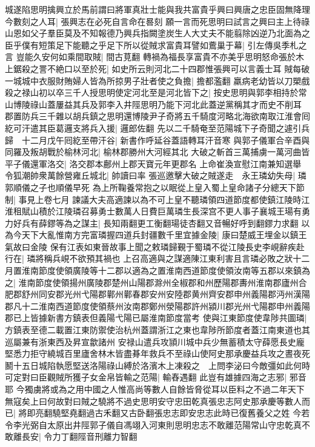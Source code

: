 城遂陷思明擒興立於馬前謂曰將軍真壯士能與我共富貴乎興曰興唐之忠臣固無降理今數刻之人耳|{
	張興志在必死自言命在晷刻}
願一言而死思明曰試言之興曰主上待祿山恩如父子羣臣莫及不知報德乃興兵指闕塗炭生人大丈夫不能翦除凶逆乃北面為之臣乎僕有短策足下能聽之乎足下所以從賊求富貴耳譬如鷰巢于幕|{
	引左傳吳季札之言}
豈能久安何如乘間取賊|{
	間古莧翻}
轉禍為福長享富貴不亦美乎思明怒命張於木上鋸殺之詈不絶口以至於死|{
	如史所云則河北二十四郡惟張興可以言義士耳}
賊每破一城城中衣服財賄婦人皆為所掠男子壯者使之負擔|{
	擔都濫翻}
羸病老幼皆以刀槊戲殺之禄山初以卒三千人授思明使定河北至是河北皆下之|{
	按史思明與郭李相持於常山博陵祿山蓋屢益其兵及郭李入井陘思明乃能下河北此蓋逆黨稱其才而史不削耳}
郡置防兵三千雜以胡兵鎮之思明還博陵尹子奇將五千騎度河略北海欲南取江淮會囘紇可汗遣其臣葛邏支將兵入援|{
	邏郎佐翻}
先以二千騎奄至范陽城下子奇聞之遽引兵歸　十二月戊午囘紇至帶汗谷|{
	新書作呼延谷蓋語轉耳汗音寒}
與郭子儀軍合辛酉與同羅及叛胡戰於榆林河北|{
	榆林郡勝州大河經其北}
大破之斬首三萬捕虜一萬河曲皆平子儀還軍洛交|{
	洛交郡本鄜州上郡天寶元年更郡名}
上命崔渙宣慰江南兼知選舉　令狐潮帥衆萬餘營雍丘城北|{
	帥讀曰率}
張巡邀擊大破之賊遂走　永王璘幼失母|{
	璘郭順儀之子也順儀早死}
為上所鞠養常抱之以眠從上皇入蜀上皇命諸子分總天下節制|{
	事見上卷七月}
諫議大夫高適諫以為不可上皇不聽璘領四道節度都使鎮江陵時江淮租賦山積於江陵璘召募勇士數萬人日費巨萬璘生長深宫不更人事子襄城王瑒有勇力好兵有薛鏐等為之謀主|{
	長知兩翻更工衡翻瑒徒杏翻又音暢好呼到翻鏐力求翻}
以為今天下大亂惟南方完富璘握四道兵封疆數千里宜據金陵|{
	康曰楚威王埋金以鎮王氣故曰金陵}
保有江表如東晉故事上聞之敕璘歸覲于蜀璘不從江陵長史李峴辭疾赴行在|{
	璘將稱兵峴不欲預其禍也}
上召高適與之謀適陳江東利害且言璘必敗之狀十二月置淮南節度使領廣陵等十二郡以適為之置淮南西道節度使領汝南等五郡以來鎮為之|{
	淮南節度使領揚州廣陵郡楚州山陽郡滁州全椒郡和州歷陽郡夀州淮南郡廬州合肥郡舒州同安郡光州弋陽郡鄿州鄿春郡安州安陸郡黄州齊安郡申州義陽郡沔州漢陽郡凡十二淮南西道節度使領蔡州汝南郡鄭州滎陽郡許州潁川郡光州弋陽郡申州義陽郡已上皆據新書方鎮表但義陽弋陽已屬淮南節度當考}
使與江東節度使韋陟共圖璘|{
	方鎮表至德二載置江東防禦使治杭州蓋謂浙江之東也韋陟所節度者蓋江南東道也其巡屬兼有浙東西及昇宣歙諸州}
安禄山遣兵攻頴川城中兵少無蓄積太守薛愿長史龐堅悉力拒守繞城百里廬舍林木皆盡朞年救兵不至祿山使阿史那承慶益兵攻之晝夜死鬭十五日城陷執愿堅送洛陽祿山縛於洛濱木上凍殺之　上問李泌曰今敵彊如此何時可定對曰臣觀賊所獲子女金帛皆輸之范陽|{
	輸舂遇翻}
此豈有雄據四海之志邪|{
	邪音耶}
今獨虜將或為之用中國之人惟高尚等數人自餘皆脅從耳以臣料之不過二年天下無寇矣上曰何故對曰賊之驍將不過史思明安守忠田乾真張忠志阿史那承慶等數人而已|{
	將即亮翻驍堅堯翻過古禾翻又古卧翻張忠志即安忠志此時已復舊養父之姓}
今若令李光弼自太原出井陘郭子儀自馮翊入河東則思明忠志不敢離范陽常山守忠乾真不敢離長安|{
	令力丁翻陘音刑離力智翻}
